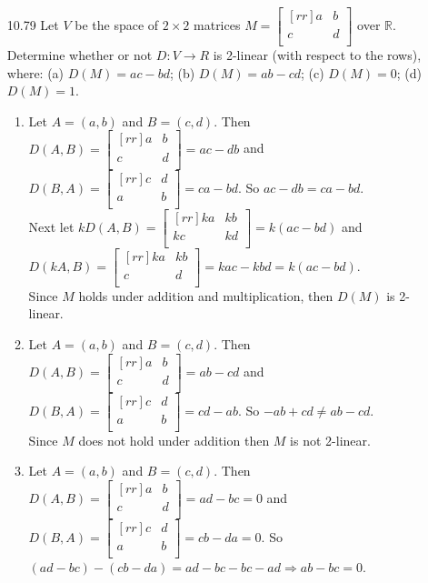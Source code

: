 \documentclass[12pt]{article}
\theoremstyle{definition}
\theoremstyle{plain}
\begin{document}
\begin{enumerate}
\item[10.79]Let $V$ be the space of $2 \times 2$ matrices $M=\begin{bmatrix}[rr]a&b\\c&d\\\end{bmatrix}$ over $\mathbb{R}$. Determine whether or not $D: V\rightarrow R$ is 2-linear (with respect to the rows), where: (a) $D(M)=ac-bd$; (b) $D(M)=ab-cd$; (c) $D(M)=0$; (d) $D(M)=1$.
	\begin{enumerate}
	\item Let $A=(a,b)$ and $B=(c,d)$. Then $D(A,B)=\begin{bmatrix}[rr]a&b\\c&d\\\end{bmatrix}=ac-db$ and $D(B,A)=\begin{bmatrix}[rr]c&d\\a&b\\\end{bmatrix}=ca-bd$. So $ac-db = ca-bd$.\\
	Next let $kD(A,B)=\begin{bmatrix}[rr]ka&kb\\kc&kd\\\end{bmatrix}=k(ac-bd)$ and $D(kA,B)=\begin{bmatrix}[rr]ka&kb\\c&d\\\end{bmatrix}=kac-kbd=k(ac-bd)$.\\
	Since $M$ holds under addition and multiplication, then $D(M)$ is 2-linear.
	\item Let $A=(a,b)$ and $B=(c,d)$. Then $D(A,B)=\begin{bmatrix}[rr]a&b\\c&d\\\end{bmatrix}=ab-cd$ and $D(B,A)=\begin{bmatrix}[rr]c&d\\a&b\\\end{bmatrix}=cd-ab$. So $ -ab+cd \neq ab-cd$.\\
	Since $M$ does not hold under addition then $M$ is not 2-linear.
	\item Let $A=(a,b)$ and $B=(c,d)$. Then $D(A,B)=\begin{bmatrix}[rr]a&b\\c&d\\\end{bmatrix}=ad-bc=0$ and $D(B,A)=\begin{bmatrix}[rr]c&d\\a&b\\\end{bmatrix}=cb-da=0$. So $(ad-bc) - (cb-da) = ad-bc-bc-ad \Rightarrow ab-bc = 0$.\\

\end{enumerate}
\end{enumerate}
\end{document}
